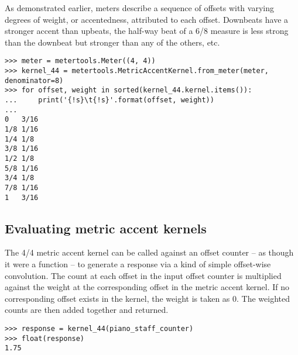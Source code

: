 As demonstrated earlier, meters describe a sequence of offsets with varying
degrees of weight, or accentedness, attributed to each offset. Downbeats have a
stronger accent than upbeats, the half-way beat of a 6/8 measure is less strong
than the downbeat but stronger than any of the others, etc.

\begin{comment}
<abjad>
meter = metertools.Meter((4, 4))
kernel_44 = metertools.MetricAccentKernel.from_meter(meter, denominator=8)
for offset, weight in sorted(kernel_44.kernel.items()):
    print('{!s}\t{!s}'.format(offset, weight))

</abjad>
\end{comment}

\begin{singlespacing}
\vspace{-0.5\baselineskip}
\begin{lstlisting}
>>> meter = metertools.Meter((4, 4))
>>> kernel_44 = metertools.MetricAccentKernel.from_meter(meter, denominator=8)
>>> for offset, weight in sorted(kernel_44.kernel.items()):
...     print('{!s}\t{!s}'.format(offset, weight))
...
0	3/16
1/8	1/16
1/4	1/8
3/8	1/16
1/2	1/8
5/8	1/16
3/4	1/8
7/8	1/16
1	3/16
\end{lstlisting}
\end{singlespacing}

\subsection{Evaluating metric accent kernels} %

\noindent The 4/4 metric accent kernel can be called against an offset counter
-- as though it were a function -- to generate a response via a kind of simple
offset-wise convolution. The count at each offset in the input offset counter
is multiplied against the weight at the corresponding offset in the metric
accent kernel. If no corresponding offset exists in the kernel, the weight is
taken as 0. The weighted counts are then added together and returned.

\begin{comment}
<abjad>
response = kernel_44(piano_staff_counter)
float(response)
</abjad>
\end{comment}

\begin{singlespacing}
\vspace{-0.5\baselineskip}
\begin{lstlisting}
>>> response = kernel_44(piano_staff_counter)
>>> float(response)
1.75
\end{lstlisting}
\end{singlespacing}

